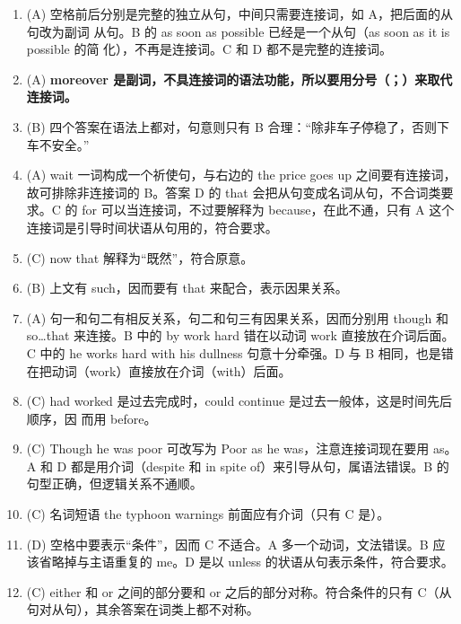 \begin{enumerate}

\item (A) 空格前后分别是完整的独立从句，中间只需要连接词，如 A，把后面的从句改为副词
  从句。B 的 as soon as possible 已经是一个从句（as soon as it is possible 的简
  化），不再是连接词。C 和 D 都不是完整的连接词。

\item (A) \textbf{moreover 是副词，不具连接词的语法功能，所以要用分号（；）来取代连接词。}

\item (B) 四个答案在语法上都对，句意则只有 B 合理：“除非车子停稳了，否则下车不安全。”

\item (A) wait 一词构成一个祈使句，与右边的 the price goes up 之间要有连接词，故可排除非连接词的 B。答案 D 的 that 会把从句变成名词从句，不合词类要求。C 的 for 可以当连接词，不过要解释为 because，在此不通，只有 A 这个连接词是引导时间状语从句用的，符合要求。

\item (C) now that 解释为“既然”，符合原意。

\item (B) 上文有 such，因而要有 that 来配合，表示因果关系。

\item (A) 句一和句二有相反关系，句二和句三有因果关系，因而分别用 though 和 so…that 来连接。B 中的 by work hard 错在以动词 work 直接放在介词后面。C 中的 he works hard with his dullness 句意十分牵强。D 与 B 相同，也是错在把动词（work）直接放在介词（with）后面。

\item (C) had worked 是过去完成时，could continue 是过去一般体，这是时间先后顺序，因
  而用 before。

\item  (C) Though he was poor 可改写为 Poor as he was，注意连接词现在要用 as。A 和 D 都是用介词（despite 和 in spite of）来引导从句，属语法错误。B 的句型正确，但逻辑关系不通顺。

\item (C) 名词短语 the typhoon warnings 前面应有介词（只有 C 是）。

\item  (D) 空格中要表示“条件”，因而 C 不适合。A 多一个动词，文法错误。B 应该省略掉与主语重复的 me。D 是以 unless 的状语从句表示条件，符合要求。

\item  (C) either 和 or 之间的部分要和 or 之后的部分对称。符合条件的只有 C（从句对从句），其余答案在词类上都不对称。


\end{enumerate}
